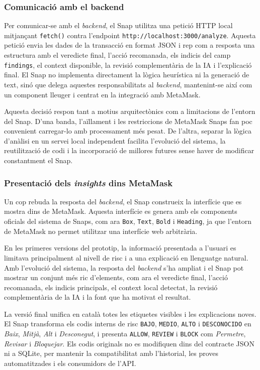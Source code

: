 \subsubsection{Comunicació amb el backend}

Per comunicar-se amb el \textit{backend}, el Snap utilitza una petició HTTP local mitjançant \texttt{fetch()} contra l’endpoint \texttt{http://localhost:3000/analyze}. Aquesta petició envia les dades de la transacció en format JSON i rep com a resposta una estructura amb el veredicte final, l’acció recomanada, els indicis del camp \texttt{findings}, el context disponible, la revisió complementària de la IA i l’explicació final. El Snap no implementa directament la lògica heurística ni la generació de text, sinó que delega aquestes responsabilitats al \textit{backend}, mantenint-se així com un component lleuger i centrat en la integració amb MetaMask.

Aquesta decisió respon tant a motius arquitectònics com a limitacions de l’entorn del Snap. D’una banda, l’aïllament i les restriccions de MetaMask Snaps fan poc convenient carregar-lo amb processament més pesat. De l’altra, separar la lògica d’anàlisi en un servei local independent facilita l’evolució del sistema, la reutilització de codi i la incorporació de millores futures sense haver de modificar constantment el Snap.

\subsubsection{Presentació dels \textit{insights} dins MetaMask}

Un cop rebuda la resposta del \textit{backend}, el Snap construeix la interfície que es mostra dins de MetaMask. Aquesta interfície es genera amb els components oficials del sistema de Snaps, com ara \texttt{Box}, \texttt{Text}, \texttt{Bold} i \texttt{Heading}, ja que l’entorn de MetaMask no permet utilitzar una interfície web arbitrària.

En les primeres versions del prototip, la informació presentada a l’usuari es limitava principalment al nivell de risc i a una explicació en llenguatge natural. Amb l’evolució del sistema, la resposta del \textit{backend} s’ha ampliat i el Snap pot mostrar un conjunt més ric d’elements, com ara el veredicte final, l’acció recomanada, els indicis principals, el context local detectat, la revisió complementària de la IA i la font que ha motivat el resultat.

La versió final unifica en català totes les etiquetes visibles i les explicacions noves. El Snap transforma els codis interns de risc \texttt{BAJO}, \texttt{MEDIO}, \texttt{ALTO} i \texttt{DESCONOCIDO} en \textit{Baix}, \textit{Mitjà}, \textit{Alt} i \textit{Desconegut}, i presenta \texttt{ALLOW}, \texttt{REVIEW} i \texttt{BLOCK} com \textit{Permetre}, \textit{Revisar} i \textit{Bloquejar}. Els codis originals no es modifiquen dins del contracte JSON ni a SQLite, per mantenir la compatibilitat amb l’historial, les proves automatitzades i els consumidors de l’API.

